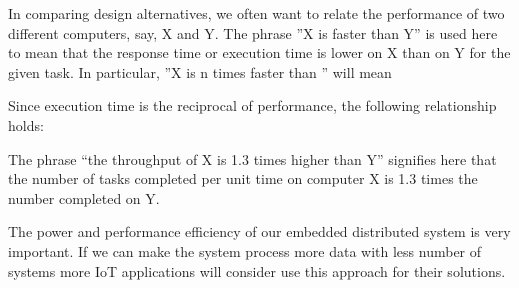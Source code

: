 In comparing design alternatives, we often want to relate the performance of
two different computers, say, X and Y. The phrase ''X is faster than Y'' is
used here to mean that the response time or execution time is lower on X than
on Y for the given task. In particular, ''X is n times faster than ''  will
mean

Since execution time is the reciprocal of performance, the following
relationship holds:

The phrase “the throughput of X is 1.3 times higher than Y” signifies here that
the number of tasks completed per unit time on computer X is 1.3 times the
number completed on Y.

The power and performance efficiency of our embedded distributed system is very
important. If we can  make the system process more data with less number
of systems more IoT applications will consider use this approach for their
solutions.

\clearpage

